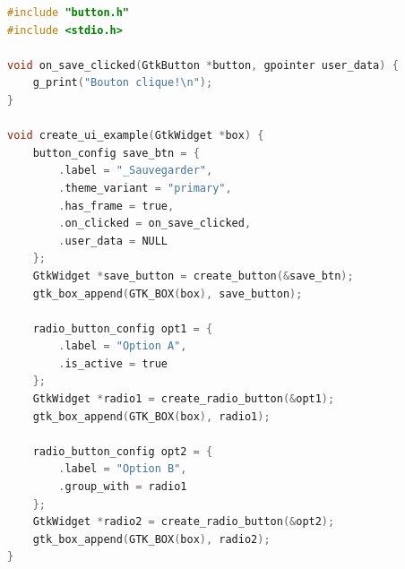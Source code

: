 \begin{lstlisting}[language=C]
#include "button.h"
#include <stdio.h>

void on_save_clicked(GtkButton *button, gpointer user_data) {
    g_print("Bouton clique!\n");
}

void create_ui_example(GtkWidget *box) {
    button_config save_btn = {
        .label = "_Sauvegarder",
        .theme_variant = "primary",
        .has_frame = true,
        .on_clicked = on_save_clicked,
        .user_data = NULL
    };
    GtkWidget *save_button = create_button(&save_btn);
    gtk_box_append(GTK_BOX(box), save_button);

    radio_button_config opt1 = {
        .label = "Option A",
        .is_active = true
    };
    GtkWidget *radio1 = create_radio_button(&opt1);
    gtk_box_append(GTK_BOX(box), radio1);

    radio_button_config opt2 = {
        .label = "Option B",
        .group_with = radio1
    };
    GtkWidget *radio2 = create_radio_button(&opt2);
    gtk_box_append(GTK_BOX(box), radio2);
}
\end{lstlisting}

